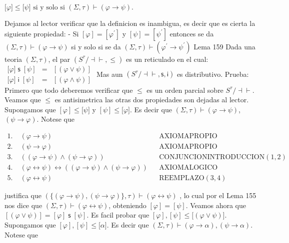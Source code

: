 \(\displaystyle \lbrack \varphi ]\leq \lbrack \psi ]\text{ si y solo si }(\Sigma ,\tau )\vdash \left( \varphi \rightarrow \psi \right) . \)

Dejamos al lector verificar que la definicion es inambigua, es decir que es cierta la siguiente propiedad:
- Si \([\varphi ]=[\varphi ^{\prime }]\) y \([\psi ]=[\psi ^{\prime }]\) entonces se da \((\Sigma ,\tau )\vdash \left( \varphi \rightarrow \psi \right) \) si y solo si se da \((\Sigma ,\tau )\vdash \left( \varphi ^{\prime }\rightarrow \psi ^{\prime }\right) \)
Lema 159 Dada una teoria \((\Sigma ,\tau )\), el par \((S^{\tau }/\mathrm{\dashv \vdash } ,\leq )\) es un reticulado en el cual:
\(\displaystyle \begin{array}{rcl} \lbrack \varphi ]\;\mathsf{s\;}[\psi ] & =& [(\varphi \vee \psi )] \\ \lbrack \varphi ]\;\mathsf{i\;}[\psi ] & =& [(\varphi \wedge \psi )] \end{array} \)
Mas aun \((S^{\tau }/\mathrm{\dashv \vdash },\mathsf{s},\mathsf{i})\) es distributivo.
Prueba: Primero que todo deberemos verificar que \(\leq \) es un orden parcial sobre \( S^{\tau }/\dashv \vdash \). Veamos que \(\leq \) es antisimetrica las otras dos propiedades son dejadas al lector. Supongamos que \([\varphi ]\leq \lbrack \psi ]\) y \([\psi ]\leq \lbrack \varphi ].\) Es decir que \((\Sigma ,\tau )\vdash \left( \varphi \rightarrow \psi \right) \), \(\left( \psi \rightarrow \varphi \right) .\) Notese que

\(\displaystyle \begin{array}{llll} 1.\; & \left( \varphi \rightarrow \psi \right) & & \text{AXIOMAPROPIO} \\ 2.\; & \left( \psi \rightarrow \varphi \right) & & \text{AXIOMAPROPIO} \\ 3.\; & ((\varphi \rightarrow \psi )\wedge (\psi \rightarrow \varphi )) & & \text{CONJUNCIONINTRODUCCION}(1,2) \\ 4.\; & (\varphi \leftrightarrow \psi )\leftrightarrow ((\varphi \rightarrow \psi )\wedge (\psi \rightarrow \varphi )) & & \text{AXIOMALOGICO} \\ 5.\; & (\varphi \leftrightarrow \psi ) & & \text{REEMPLAZO}(3,4) \end{array} \)

justifica que \((\{\left( \varphi \rightarrow \psi \right) ,\left( \psi \rightarrow \varphi \right) \},\tau )\vdash (\varphi \leftrightarrow \psi )\) , lo cual por el Lema 155 nos dice que \((\Sigma ,\tau )\vdash (\varphi \leftrightarrow \psi )\), obteniendo \([\varphi ]=[\psi ].\)
Veamos ahora que \([(\varphi \vee \psi )]=[\varphi ]\;\mathsf{s\;}[\psi ].\) Es facil probar que \([\varphi ],[\psi ]\leq \lbrack (\varphi \vee \psi )].\) Supongamos que \([\varphi ],[\psi ]\leq \lbrack \alpha ].\) Es decir que \( (\Sigma ,\tau )\vdash (\varphi \rightarrow \alpha ),(\psi \rightarrow \alpha ).\) Notese que

